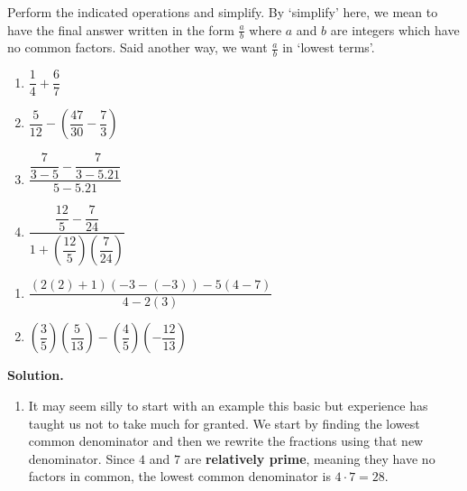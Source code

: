 \begin{ex} \label{fractionreview}  Perform the indicated operations and simplify. By `simplify' here, we mean to have the final answer written in the form $\frac{a}{b}$ where $a$ and $b$ are integers which have no common factors.  Said another way, we want $\frac{a}{b}$ in `lowest terms'.

\begin{enumerate}

\item $\dfrac{1}{4} + \dfrac{6}{7}$
\item $\dfrac{5}{12} - \left(\dfrac{47}{30} - \dfrac{7}{3}\right)$
\item $\dfrac{\dfrac{7}{3-5} - \dfrac{7}{3-5.21}}{5-5.21}$
\item $\dfrac{\dfrac{12}{5} - \dfrac{7}{24}}{1 + \left(\dfrac{12}{5}\right) \left(\dfrac{7}{24}\right)}$ 

\setcounter{HW}{\value{enumi}}
\end{enumerate}


\begin{enumerate}
\setcounter{enumi}{\value{HW}}

\item $\dfrac{(2(2)+1)(-3-(-3)) - 5(4-7)}{4-2(3)}$
\item $\left(\dfrac{3}{5} \right) \left(\dfrac{5}{13} \right) - \left(\dfrac{4}{5}\right) \left( - \dfrac{12}{13}\right)$

\setcounter{HW}{\value{enumi}}
\end{enumerate}

{\bf Solution.}

\begin{enumerate}

\item It may seem silly to start with an example this basic but experience has taught us not to take much for granted.  We start by finding the lowest common denominator and then we rewrite the fractions using that new denominator.  Since $4$ and $7$ are {\bf relatively prime}, meaning they have no factors in common, the lowest common denominator is $4 \cdot 7 = 28$.


\end{enumerate}
\end{ex}
